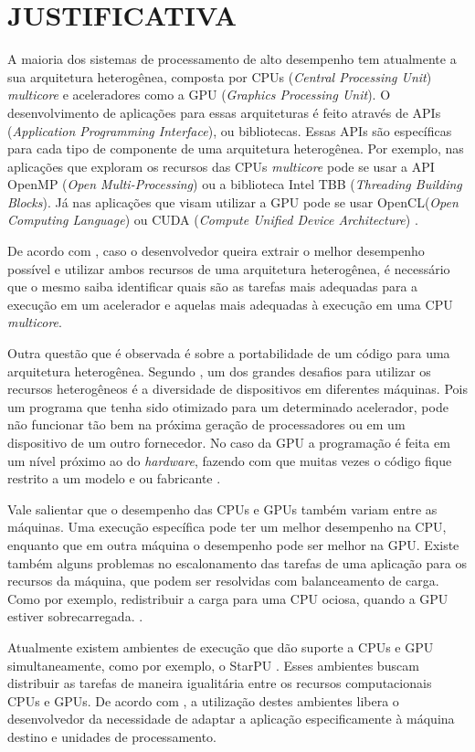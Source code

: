 
\chapter{JUSTIFICATIVA}
\label{chap:justificativa}

A maioria dos sistemas de processamento de alto desempenho tem atualmente a sua arquitetura heterogênea,
composta por CPUs (\textit{Central Processing Unit}) \textit{multicore} e aceleradores como a GPU (\textit{Graphics Processing Unit}).
O desenvolvimento de aplicações para essas arquiteturas é feito através de APIs (\textit{Application Programming Interface}), ou bibliotecas.
Essas APIs são específicas para cada tipo de componente de uma arquitetura heterogênea. Por exemplo, nas aplicações que exploram os recursos
das CPUs \textit{multicore} pode se usar a API OpenMP (\textit{Open Multi-Processing}) \cite{openmp:2018} ou a biblioteca
Intel TBB \cite{inteltbb:2018} (\textit{Threading Building Blocks}).
Já nas aplicações que visam utilizar a GPU pode se usar OpenCL(\textit{Open Computing Language}) \cite{opencl:2018} ou CUDA (\textit{Compute Unified Device Architecture}) \cite{cuda:2018}.

De acordo com \cite{intrArqHete:2012}, caso o desenvolvedor queira extrair o melhor desempenho possível e utilizar ambos recursos de uma
arquitetura heterogênea, é necessário que o mesmo saiba identificar quais são as tarefas mais adequadas para a execução em um acelerador
e aquelas mais adequadas à execução em uma CPU \textit{multicore}.

Outra questão que é observada é sobre a portabilidade de um código para uma arquitetura heterogênea.
Segundo \cite{problemsArqHete:2013}, um dos grandes desafios para utilizar os recursos heterogêneos é a diversidade de dispositivos em diferentes máquinas.
Pois um programa que tenha sido otimizado para um determinado acelerador, pode não funcionar tão bem na próxima geração de processadores ou em um dispositivo de um outro fornecedor.
No caso da GPU a programação é feita em um nível próximo ao do \textit{hardware}, fazendo com que muitas vezes o código fique restrito a um modelo e ou fabricante \cite{pinto2011ambientes}.

Vale salientar que o desempenho das CPUs e GPUs também variam entre as máquinas.
Uma execução específica pode ter um melhor desempenho na CPU, enquanto que em outra máquina o desempenho pode ser melhor na GPU.
Existe também alguns problemas no escalonamento das tarefas de uma aplicação para os recursos da máquina, que podem ser resolvidas com balanceamento de carga.
Como por exemplo, redistribuir a carga para uma CPU ociosa, quando a GPU estiver sobrecarregada. \cite{problemsArqHete:2013}.

Atualmente existem ambientes de execução que dão suporte a CPUs e GPU simultaneamente, como por exemplo, o StarPU \cite{augonnet2011starpu}.
Esses ambientes buscam distribuir as tarefas de maneira igualitária entre os recursos computacionais CPUs e GPUs.
De acordo com \cite{kumar:tel-01538516}, a utilização destes ambientes libera o desenvolvedor da necessidade de adaptar a aplicação especificamente
à máquina destino e unidades de processamento.